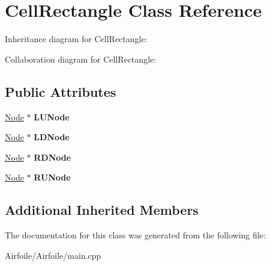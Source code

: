 \hypertarget{class_cell_rectangle}{}\section{Cell\+Rectangle Class Reference}
\label{class_cell_rectangle}


Inheritance diagram for Cell\+Rectangle\+:


Collaboration diagram for Cell\+Rectangle\+:
\subsection*{Public Attributes}
\begin{DoxyCompactItemize}
\item 
\mbox{\label{class_cell_rectangle_a16a75daaa5f08d9f0f9c3105b6a4b26a}} 
\mbox{\hyperlink{class_node}{Node}} $\ast$ {\bfseries L\+U\+Node}
\item 
\mbox{\label{class_cell_rectangle_a1939d7f9fa9d36d48e1aa1987069ac4e}} 
\mbox{\hyperlink{class_node}{Node}} $\ast$ {\bfseries L\+D\+Node}
\item 
\mbox{\label{class_cell_rectangle_a6dc29a537871fb86f5acf6d14e6be58e}} 
\mbox{\hyperlink{class_node}{Node}} $\ast$ {\bfseries R\+D\+Node}
\item 
\mbox{\label{class_cell_rectangle_acec9e2148daf56c7ef2fe9780d415676}} 
\mbox{\hyperlink{class_node}{Node}} $\ast$ {\bfseries R\+U\+Node}
\end{DoxyCompactItemize}
\subsection*{Additional Inherited Members}


The documentation for this class was generated from the following file\+:\begin{DoxyCompactItemize}
\item 
Airfoile/\+Airfoile/main.\+cpp\end{DoxyCompactItemize}
